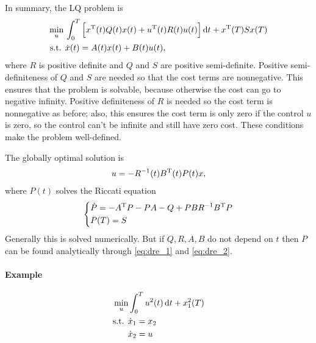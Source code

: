 In summary, the LQ problem is
\begin{align}
  \min_u {} & \int_0^T \Big[ x^\text{T}(t)Q(t)x(t) + u^\text{T}(t)R(t)u(t) \Big] \mathop{}\!\mathrm{d} t + x^\text{T}(T)Sx(T) \\
  \text{s.t. } & \dot x(t) = A(t)x(t) + B(t)u(t),
\end{align}
where $R$ is positive definite and $Q$ and $S$ are positive semi-definite. Positive semi-definiteness of $Q$ and $S$ are needed so that the cost terms are nonnegative. This ensures that the problem is solvable, because otherwise the cost can go to negative infinity. Positive definiteness of $R$ is needed so the cost term is nonnegative as before; also, this ensures the cost term is only zero if the control $u$ is zero, so the control can't be infinite and still have zero cost. These conditions make the problem well-defined.

The globally optimal solution is
\begin{gather}
  u = -R^{-1}(t) B^\text{T}(t) P(t) x,
\end{gather}
where $P(t)$ solves the Riccati equation
\begin{gather}
  \begin{dcases}
    \dot P = -A^\text{T} P - PA - Q + PBR^{-1}B^\text{T} P \\
    P(T) = S
  \end{dcases}
\end{gather}
Generally this is solved numerically. But if $Q,R,A,B$ do not depend on $t$ then $P$ can be found analytically through \eqref{eq:dre_1} and \eqref{eq:dre_2}.

\paragraph{Example} \mbox{}
\begin{align}
  & \min_u \int_0^T u^2(t)\mathop{}\!\mathrm{d} t + x_1^2(T) \\
  & \text{s.t. } \begin{aligned}[t]
    \dot x_1 &= x_2 \\
    \dot x_2 &= u
  \end{aligned}
\end{align}

